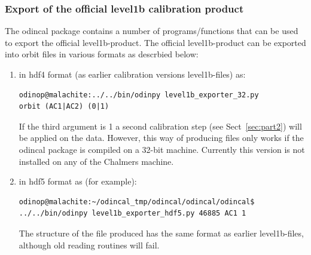 \documentclass[12pt]{article}
\begin{document}
\subsubsection{Export of the official level1b calibration product} 
\label{sec:officialexport}
The odincal package contains a number of programs/functions 
that can be used to export the official level1b-product.
The official level1b-product can be exported into
orbit files in various formats as descrbied below:
\begin{enumerate} 
\item in hdf4 format (as earlier calibration versions level1b-files) as: 
\begin{verbatim}
odinop@malachite:../../bin/odinpy level1b_exporter_32.py  
orbit (AC1|AC2) (0|1) 
\end{verbatim}
If the third argument is 1 a second calibration step
(see Sect~\ref{sec:part2}) will be applied on the data.
However, this way of producing files only works if the odincal
package is compiled on a 32-bit machine. Currently this version is
not installed on any of the Chalmers machine.
\item in hdf5 format as (for example): 

\begin{verbatim}
odinop@malachite:~/odincal_tmp/odincal/odincal/odincal$
../../bin/odinpy level1b_exporter_hdf5.py 46885 AC1 1
\end{verbatim}
The structure of the file produced has the same format as earlier
level1b-files, although old reading routines will fail.


\end{enumerate}
\end{document}
